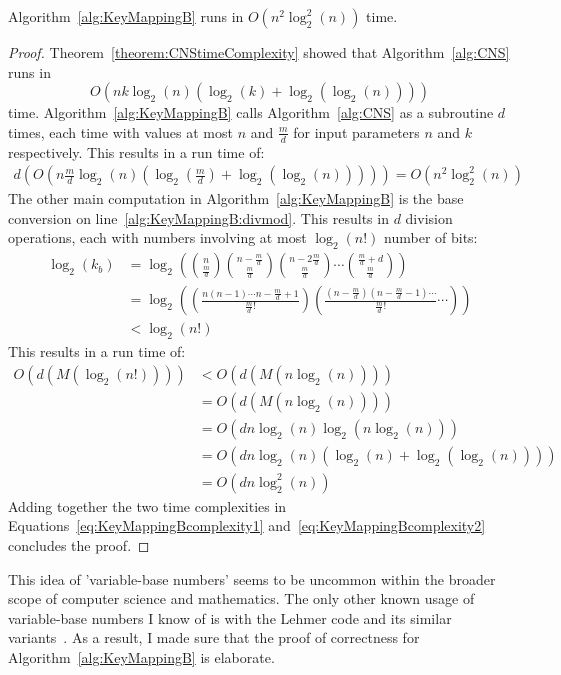 \begin{theorem}
Algorithm~\ref{alg:KeyMappingB} runs in $O\left(n^2\log_2^2 (n) \right)$ time.
\end{theorem}
\begin{proof}
Theorem~\ref{theorem:CNStimeComplexity} showed that Algorithm~\ref{alg:CNS} runs in $$O\left(nk\log_2(n)(\log_2(k)+\log_2(\log_2(n)))\right)$$ time. Algorithm~\ref{alg:KeyMappingB} calls Algorithm~\ref{alg:CNS} as a subroutine $d$ times, each time with values at most $n$ and $\frac{m}{d}$ for input parameters $n$ and $k$ respectively. This results in a run time of:
\begin{align}
d\left(O\left(n\frac{m}{d}\log_2 (n) \left(\log_2 (\frac{m}{d}) + \log_2 (\log_2 (n))\right)\right)\right) = O\left(n^2\log_2^2 (n)\right) \label{eq:KeyMappingBcomplexity1}
\end{align}
The other main computation in Algorithm~\ref{alg:KeyMappingB} is the base conversion on line~\ref{alg:KeyMappingB:divmod}. This results in $d$ division operations, each with numbers involving at most $\log_2(n!)$ number of bits:
\begin{align}
\log_2(k_b) &= \log_2\left({n \choose \frac{m}{d}}{n - \frac{m}{d} \choose \frac{m}{d}}{n - 2\frac{m}{d} \choose \frac{m}{d}}\cdots{\frac{m}{d} + d \choose \frac{m}{d}}\right) \\
&= \log_2\left(\left(\frac{n(n-1)\cdots n-\frac{m}{d}+1}{\frac{m}{d}!}\right)\left(\frac{(n-\frac{m}{d})(n-\frac{m}{d}-1)\cdots }{\frac{m}{d}!}\cdots\right)\right)\\
&< \log_2(n!)
\end{align}
This results in a run time of:
\begin{align}
O\left(d(M(\log_2(n!)))\right) &< O\left(d(M(n \log_2(n)))\right)\\
&= O\left(d(M(n \log_2(n)))\right) \\
&= O\left(dn \log_2(n)\log_2(n \log_2(n))\right) \\
&= O\left(dn \log_2(n)(\log_2(n) + \log_2(\log_2(n)))\right) \\
&= O\left(dn \log_2^2(n)\right) \label{eq:KeyMappingBcomplexity2}
\end{align}
Adding together the two time complexities in Equations~\eqref{eq:KeyMappingBcomplexity1} and~\eqref{eq:KeyMappingBcomplexity2} concludes the proof.
\end{proof}

This idea of 'variable-base numbers' seems to be uncommon within the broader scope of computer science and mathematics. The only other known usage of variable-base numbers I know of is with the Lehmer code and its similar variants~\cite{arndt2010matters}. As a result, I made sure that the proof of correctness for Algorithm~\ref{alg:KeyMappingB} is elaborate.

